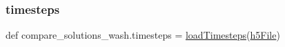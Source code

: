 \subsubsection{\texorpdfstring{timesteps}{timesteps}}
{\footnotesize\ttfamily def compare\+\_\+solutions\+\_\+wash.\+timesteps = \mbox{\hyperlink{namespacecompare__solutions__wash_a45f4b24054ceb028d7ca53bcdeefef5f}{load\+Timesteps}}(\mbox{\hyperlink{namespacecompare__solutions__wash_a134c58f3c3cb96d84b6070546fd6830c}{h5\+File}})}

